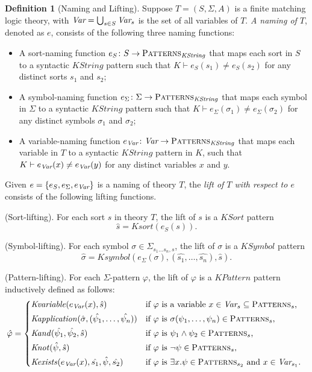 \documentclass[UTF8,11pt]{article}
\newcounter{thmcounter}
\theoremstyle{plain}
\theoremstyle{definition}
\newtheorem{definition} [thmcounter]{Definition}
\theoremstyle{remark}
\newcommand{\PATTERNS}{\text{P\textsc{atterns}}}
\newcommand{\KString}{\mathit{KString}}
\newcommand{\KSort}{\mathit{KSort}}
\newcommand{\Ksort}{\mathit{Ksort}}
\newcommand{\KSymbol}{\mathit{KSymbol}}
\newcommand{\Ksymbol}{\mathit{Ksymbol}}
\newcommand{\KPattern}{\mathit{KPattern}}
\newcommand{\Kvariable}{\mathit{Kvariable}}
\newcommand{\Kand}{\mathit{Kand}}
\newcommand{\Knot}{\mathit{Knot}}
\newcommand{\Kapplication}{\mathit{Kapplication}}
\newcommand{\Kexists}{\mathit{Kexists}}
\begin{document}
\begin{definition}[Naming and Lifting]
	Suppose $T = (S, \Sigma, A)$ is a finite matching logic theory, with $\textit{Var} = \bigcup_{s \in S} \textit{Var}_s$ is the set of all variables of $T$.
	\emph{A naming of $T$}, denoted as $e$, consists of the following three naming functions:
	\begin{itemize}
		\item A sort-naming function $e_S \colon S \to \PATTERNS_\KString$ that maps each sort in $S$ to a syntactic $\KString$ pattern such that $K \vdash e_S(s_1) \neq e_S(s_2)$ for any distinct sorts $s_1$ and $s_2$;
		\item A symbol-naming function $e_\Sigma \colon \Sigma \to \PATTERNS_\KString$ that maps each symbol in $\Sigma$ to a syntactic $\KString$ pattern such that $K \vdash e_\Sigma(\sigma_1) \neq e_\Sigma(\sigma_2)$ for any distinct symbols $\sigma_1$ and $\sigma_2$;
		\item A variable-naming function $e_\Var \colon \Var \to \PATTERNS_\KString$ that maps each variable in $T$ to a syntactic $\KString$ pattern in $K$, such that $K \vdash e_{\textit{Var}}(x) \neq e_{\textit{Var}}(y)$ for any distinct variables $x$ and $y$.
	\end{itemize}

    Given $e = \{e_S, e_\Sigma, e_{\textit{Var}} \}$ is a naming of theory $T$, the \emph{lift of $T$ with respect to $e$} consists of the following lifting functions.
    
    (Sort-lifting).
    For each sort $s$ in theory $T$, the lift of $s$ is a $\KSort$ pattern
    $$ \hat{s} = \Ksort(e_S(s)).$$
    
    (Symbol-lifting).
    For each symbol $\sigma \in \Sigma_{s_1 \dots s_n, s}$, the lift of $\sigma$ is a $\KSymbol$ pattern 
    $$ \hat{\sigma} = \Ksymbol(e_\Sigma(\sigma), (\hat{s_1}, \dots, \hat{s_n}), \hat{s}).$$
    
    (Pattern-lifting).
    For each $\Sigma$-pattern $\varphi$, the lift of $\varphi$ is a $\KPattern$ pattern inductively defined as follows:
    \begin{equation*}
      \hat{\varphi} =
      \begin{cases*}
        \Kvariable(e_\Var(x), \hat{s}) & if $\varphi$ is a variable $x \in \Var_s \subseteq \PATTERNS_s$,
        \\
        \Kapplication(\hat{\sigma}, (\hat{\psi_1}, \dots, \hat{\psi_n})) & if $\varphi$ is $\sigma(\psi_1,\dots,\psi_n) \in \PATTERNS_s$,
        \\
        \Kand(\hat{\psi_1}, \hat{\psi_2}, \hat{s}) & if $\varphi$ is $\psi_1 \wedge \psi_2 \in \PATTERNS_s$,
        \\
        \Knot(\hat{\psi}, \hat{s}) & if $\varphi$ is $\neg \psi \in \PATTERNS_s$,
        \\
        \Kexists(e_\Var(x), \hat{s_1}, \hat{\psi}, \hat{s_2}) & if $\varphi$ is $\exists x . \psi \in \PATTERNS_{s_2}$ and $x \in \Var_{s_1}$.
      \end{cases*}
    \end{equation*}
    

\end{definition}
\end{document}
